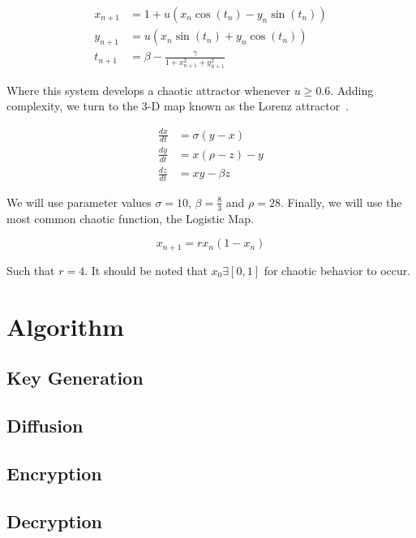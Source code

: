 \documentclass[conference]{IEEEtran}
\begin{document}
\begin{align}\label{eq:Ikeda}
    x_{n+1} &= 1 + u(x_n \cos(t_n) - y_n \sin(t_n))\\
    y_{n+1} &= u(x_n \sin(t_n) + y_n \cos(t_n))\\
    t_{n+1} &= \beta - \frac{\gamma}{1+x_{n+1}^2+y_{n+1}^2}
\end{align}

Where this system develops a chaotic attractor whenever $u\ge0.6$.
Adding complexity, we turn to the 3-D map known as the Lorenz attractor~\cite{Naik2022}.

\begin{align}\label{eq:Lorenz}
    \frac{dx}{dt} &= \sigma (y - x)\\
    \frac{dy}{dt} &= x (\rho - z) - y\\
    \frac{dz}{dt} &= xy - \beta z
\end{align}

We will use parameter values $\sigma=10$, $\beta=\frac{8}{3}$ and $\rho=28$.
Finally, we will use the most common chaotic function, the Logistic Map.

\begin{equation}\label{eq:Logistic}
    x_{n+1} = r x_n (1 - x_n)
\end{equation}

Such that $r=4$.
It should be noted that $x_0 \exists [0,1]$ for chaotic behavior to occur.

\section{Algorithm}\label{sec:algorithm}

\subsection{Key Generation}\label{subsec:key-generation}

\subsection{Diffusion}\label{subsec:diffusion}

\subsection{Encryption}\label{subsec:encryption}

\subsection{Decryption}\label{subsec:decryption}
\end{document}
